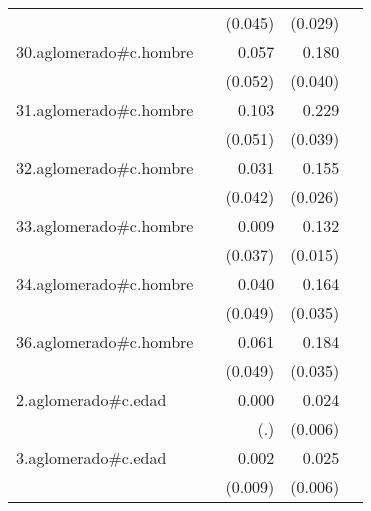{\begin{longtable}{l*{4}{D{.}{.}{-1}}}
            &                     &     (0.045)         &     (0.029)         &                     \\
\addlinespace
30.aglomerado#c.hombre&                     &       0.057         &       0.180\sym{***}&                     \\
            &                     &     (0.052)         &     (0.040)         &                     \\
\addlinespace
31.aglomerado#c.hombre&                     &       0.103\sym{*}  &       0.229\sym{***}&                     \\
            &                     &     (0.051)         &     (0.039)         &                     \\
\addlinespace
32.aglomerado#c.hombre&                     &       0.031         &       0.155\sym{***}&                     \\
            &                     &     (0.042)         &     (0.026)         &                     \\
\addlinespace
33.aglomerado#c.hombre&                     &       0.009         &       0.132\sym{***}&                     \\
            &                     &     (0.037)         &     (0.015)         &                     \\
\addlinespace
34.aglomerado#c.hombre&                     &       0.040         &       0.164\sym{***}&                     \\
            &                     &     (0.049)         &     (0.035)         &                     \\
\addlinespace
36.aglomerado#c.hombre&                     &       0.061         &       0.184\sym{***}&                     \\
            &                     &     (0.049)         &     (0.035)         &                     \\
\addlinespace
2.aglomerado#c.edad&                     &       0.000         &       0.024\sym{***}&                     \\
            &                     &         (.)         &     (0.006)         &                     \\
\addlinespace
3.aglomerado#c.edad&                     &       0.002         &       0.025\sym{***}&                     \\
            &                     &     (0.009)         &     (0.006)         &                     \\

\end{longtable}}
